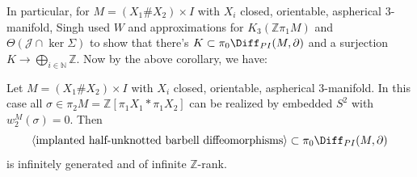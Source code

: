 In particular, for $M=(X_1\# X_2)\times I$ with $X_i$ closed, orientable, aspherical 3-manifold, Singh used $W$ and approximations for $K_3(\mathbb{Z}\pi_1 M)$ and $\Theta(\mathcal{J}\cap \ker \Sigma)$ to show that there's $K\subset \pi_0\Diff_{PI}(M,\partial)$ and a surjection $K\to \bigoplus_{i\in \mathbb{N}} \mathbb{Z}$. Now by the above corollary, we have:

\begin{corollary}
    Let $M=(X_1\# X_2)\times I$ with $X_i$ closed, orientable, aspherical 3-manifold. In this case all $\sigma\in \pi_2 M=\mathbb{Z}[\pi_1 X_1*\pi_1 X_2]$ can be realized by embedded $S^2$ with $w_2^M(\sigma)=0$. Then $$\langle\text{implanted half-unknotted barbell diffeomorphisms}\rangle\subset \pi_0\Diff_{PI}(M,\partial)$$ is infinitely generated and of infinite $\mathbb{Z}$-rank. 
\end{corollary}